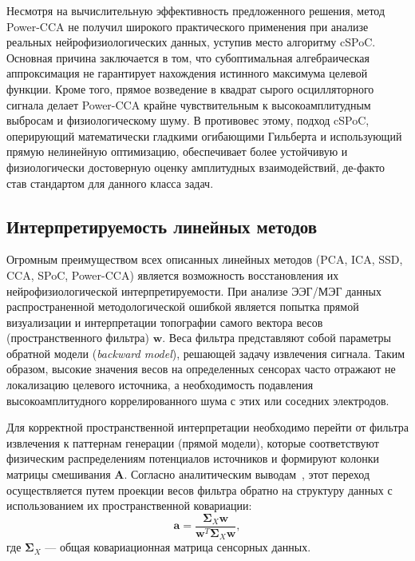 Несмотря на вычислительную эффективность предложенного решения, метод Power-CCA не получил широкого практического применения при анализе реальных нейрофизиологических данных, уступив место алгоритму cSPoC. Основная причина заключается в том, что субоптимальная алгебраическая аппроксимация не гарантирует нахождения истинного максимума целевой функции. Кроме того, прямое возведение в квадрат сырого осцилляторного сигнала делает Power-CCA крайне чувствительным к высокоамплитудным выбросам и физиологическому шуму. В противовес этому, подход cSPoC, оперирующий математически гладкими огибающими Гильберта и использующий прямую нелинейную оптимизацию, обеспечивает более устойчивую и физиологически достоверную оценку амплитудных взаимодействий, де-факто став стандартом для данного класса задач.

\subsection{Интерпретируемость линейных методов}
\label{sec:interpretability}

Огромным преимуществом всех описанных линейных методов (PCA, ICA, SSD, CCA, SPoC, Power-CCA) является возможность восстановления их нейрофизиологической интерпретируемости. При анализе ЭЭГ/МЭГ данных распространенной методологической ошибкой является попытка прямой визуализации и интерпретации топографии самого вектора весов (пространственного фильтра) $\mathbf{w}$. Веса фильтра представляют собой параметры обратной модели (\textit{backward model}), решающей задачу извлечения сигнала. Таким образом, высокие значения весов на определенных сенсорах часто отражают не локализацию целевого источника, а необходимость подавления высокоамплитудного коррелированного шума с этих или соседних электродов.

Для корректной пространственной интерпретации необходимо перейти от фильтра извлечения к паттернам генерации (прямой модели), которые соответствуют физическим распределениям потенциалов источников и формируют колонки матрицы смешивания $\mathbf{A}$. Согласно аналитическим выводам~\cite{parra2005recipes, haufe2014interpretation}, этот переход осуществляется путем проекции весов фильтра обратно на структуру данных с использованием их пространственной ковариации:
\begin{equation}
	\mathbf{a} = \frac{\mathbf{\Sigma}_X \mathbf{w}}{\mathbf{w}^T \mathbf{\Sigma}_X \mathbf{w}},
\end{equation}
где $\mathbf{\Sigma}_X$ --- общая ковариационная матрица сенсорных данных. 


